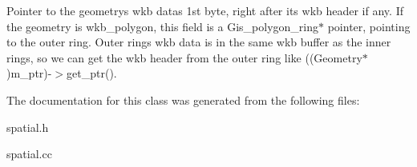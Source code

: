 Pointer to the geometry\textquotesingle{}s wkb data\textquotesingle{}s 1st byte, right after its wkb header if any. If the geometry is wkb\+\_\+polygon, this field is a Gis\+\_\+polygon\+\_\+ring$\ast$ pointer, pointing to the outer ring. Outer ring\textquotesingle{}s wkb data is in the same wkb buffer as the inner rings, so we can get the wkb header from the outer ring like ((Geometry$\ast$)m\+\_\+ptr)-\/$>$get\+\_\+ptr(). 

The documentation for this class was generated from the following files\+:\begin{DoxyCompactItemize}
\item 
spatial.\+h\item 
spatial.\+cc\end{DoxyCompactItemize}
